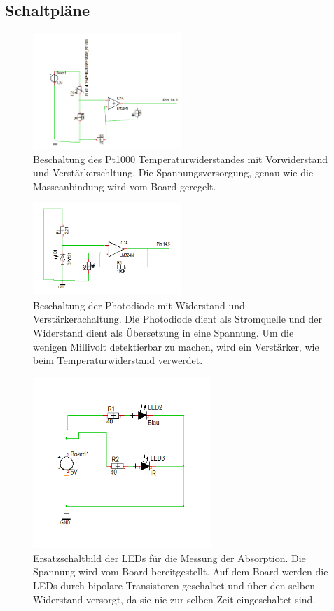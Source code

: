 \documentclass[12pt,a4paper,titlepage,headinclude,bibtotoc]{scrartcl}
\numberwithin{equation}{subsection}
\begin{document}
\subsection{Schaltpläne}
\begin{figure}[!h]
\centering
\includegraphics[width=0.5\textwidth]{Fotos/PT1000Schaltung.png}
\caption{Beschaltung des Pt1000 Temperaturwiderstandes mit Vorwiderstand und Verstärkerschltung. Die Spannungsversorgung, genau wie die Masseanbindung wird vom Board geregelt.}
\label{fig:PT1000Schaltung}
\end{figure}
\begin{figure}[!h]
\centering
\includegraphics[width=0.5\textwidth]{Fotos/PhotodiodeSchaltung.png}
\caption{Beschaltung der Photodiode mit Widerstand und Verstärkerachaltung. Die Photodiode dient als Stromquelle und der Widerstand dient als Übersetzung in eine Spannung. Um die wenigen Millivolt detektierbar zu machen, wird ein Verstärker, wie beim Temperaturwiderstand verwerdet.}
\label{fig:PhotodiodeSchaltung}
\end{figure}
\begin{figure}[!h]
\centering
\includegraphics[width=0.6\textwidth]{Fotos/LEDSchaltung.png}
\caption{Ersatzschaltbild der LEDs für die Messung der Absorption. Die Spannung wird vom Board bereitgestellt. Auf dem Board werden die LEDs durch bipolare Transistoren geschaltet und über den selben Widerstand versorgt, da sie nie zur selben Zeit eingeschaltet sind.}
\label{fig:LEDSchaltung}
\end{figure}
\end{document}
